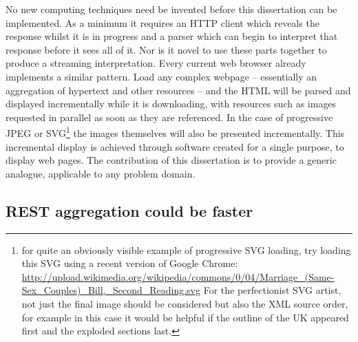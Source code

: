 \documentclass[12pt, ]{article}
\begin{document}
No new computing techniques need be invented before this dissertation
can be implemented. As a minimum it requires an HTTP client which
reveals the response whilst it is in progress and a parser which can
begin to interpret that response before it sees all of it. Nor is it
novel to use these parts together to produce a streaming interpretation.
Every current web browser already implements a similar pattern. Load any
complex webpage -- essentially an aggregation of hypertext and other
resources -- and the HTML will be parsed and displayed incrementally
while it is downloading, with resources such as images requested in
parallel as soon as they are referenced. In the case of progressive JPEG
or SVG\footnote{for quite an obviously visible example of progressive
  SVG loading, try loading this SVG using a recent version of Google
  Chrome:
  \url{http://upload.wikimedia.org/wikipedia/commons/0/04/Marriage_(Same-Sex_Couples)_Bill,_Second_Reading.svg}
  For the perfectionist SVG artist, not just the final image should be
  considered but also the XML source order, for example in this case it
  would be helpful if the outline of the UK appeared first and the
  exploded sections last.} the images themselves will also be presented
incrementally. This incremental display is achieved through software
created for a single purpose, to display web pages. The contribution of
this dissertation is to provide a generic analogue, applicable to any
problem domain.

\subsection{REST aggregation could be
faster}\label{rest-aggregation-could-be-faster}
\end{document}
